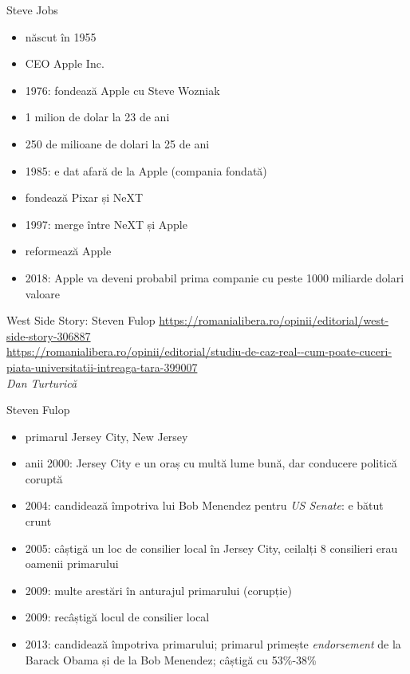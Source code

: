 \documentclass{simple}
\begin{document}
\begin{frame}{Steve Jobs}
  \begin{itemize}
    \pause \item născut în 1955
    \pause \item CEO Apple Inc.
    \pause \item 1976: fondează Apple cu Steve Wozniak
    \pause \item 1 milion de dolar la 23 de ani
    \pause \item 250 de milioane de dolari la 25 de ani
    \pause \item 1985: e dat afară de la Apple (compania fondată)
    \pause \item fondează Pixar și NeXT
    \pause \item 1997: merge între NeXT și Apple
    \pause \item reformează Apple
    \pause \item 2018: Apple va deveni probabil prima companie cu peste 1000 miliarde dolari valoare
  \end{itemize}
\end{frame}

\begin{frame}{West Side Story: Steven Fulop}
  \pause
  \tiny{\url{https://romanialibera.ro/opinii/editorial/west-side-story-306887}}\\
  \tiny{\url{https://romanialibera.ro/opinii/editorial/studiu-de-caz-real--cum-poate-cuceri-piata-universitatii-intreaga-tara-399007}}\\
  \vspace{3mm}
  \normalsize{\hfill \textit{Dan Turturică}}
\end{frame}

\begin{frame}{Steven Fulop}
  \begin{itemize}
    \pause \item primarul Jersey City, New Jersey
    \pause \item anii 2000: Jersey City e un oraș cu multă lume bună, dar conducere politică coruptă
    \pause \item 2004: candidează împotriva lui Bob Menendez pentru \textit{US Senate}: e bătut crunt
    \pause \item 2005: câștigă un loc de consilier local în Jersey City, ceilalți 8 consilieri erau oamenii primarului
    \pause \item 2009: multe arestări în anturajul primarului (corupție)
    \pause \item 2009: recâștigă locul de consilier local
    \pause \item 2013: candidează împotriva primarului; primarul primește \textit{endorsement} de la Barack Obama și de la Bob Menendez; câștigă cu 53\%-38\%
  \end{itemize}
\end{frame}
\end{document}
